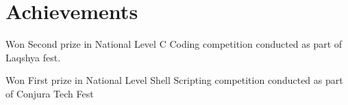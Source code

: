 \documentclass[11pt,a4paper]{moderncv}
\begin{document}

\section{Achievements}

{Won Second prize in National Level C Coding competition conducted as part of Laqshya fest.}

{Won First prize in National Level Shell Scripting competition conducted as part of Conjura Tech Fest}


\end{document}
